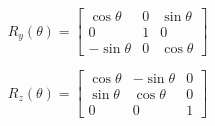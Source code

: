 \begin{equation}
	R_y(\theta)=
	\begin{bmatrix}
		\cos \theta & 0 & \sin \theta\\
		0 & 1 & 0\\
		-\sin \theta & 0 & \cos \theta
	\end{bmatrix}
\end{equation}

\begin{equation}
	R_z(\theta)=
	\begin{bmatrix}
		\cos \theta & -\sin \theta & 0\\
		\sin \theta & \cos \theta & 0\\
		0 & 0 & 1
	\end{bmatrix}
\end{equation}